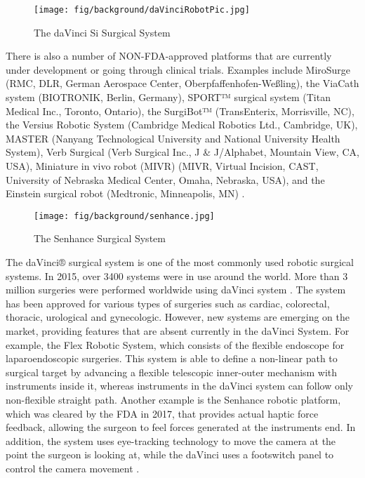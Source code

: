 \begin{figure}[h]
	\begin{center}
	\texttt{[image: fig/background/daVinciRobotPic.jpg]}
	\end{center}
	\vspace{-4mm}
	\caption[The daVinci Si Surgical System]
	{The daVinci Si Surgical System \cite{_intuitive_2018}}
	\label{fig:daVinci}
	\vspace{-2mm}
\end{figure}

There is also a number of NON-FDA-approved platforms that are currently under development or going through clinical trials. Examples include MiroSurge (RMC, DLR, German Aerospace Center, Oberpfaffenhofen-Weßling), the ViaCath system (BIOTRONIK, Berlin, Germany), SPORT™ surgical system (Titan Medical Inc., Toronto, Ontario), the SurgiBot™ (TransEnterix, Morrisville, NC), the Versius Robotic System (Cambridge Medical Robotics Ltd., Cambridge, UK), MASTER (Nanyang Technological University and National University Health System), Verb Surgical (Verb Surgical Inc., J \& J/Alphabet, Mountain View, CA, USA), Miniature in vivo robot (MIVR) (MIVR, Virtual Incision, CAST, University of Nebraska Medical Center, Omaha, Nebraska, USA), and the Einstein surgical robot (Medtronic, Minneapolis, MN) \cite{peters_review_2018}.

\begin{figure}[h]
	\begin{center}
	\texttt{[image: fig/background/senhance.jpg]}
	\end{center}
	\vspace{-4mm}
	\caption[The Senhance Surgical System]
	{The Senhance Surgical System \cite{_senhance}}
	\label{fig:Senhance}
	\vspace{-2mm}
\end{figure}

The daVinci® surgical system is one of the most commonly used robotic surgical systems. In 2015, over 3400 systems were in use around the world. More than 3 million surgeries were performed worldwide using daVinci system \cite{_intuitive_2018}. The system has been approved for various types of surgeries such as cardiac, colorectal, thoracic, urological and gynecologic. However, new systems are emerging on the market, providing features that are absent currently in the daVinci System. For example, the Flex Robotic System, which consists of the flexible endoscope for laparoendoscopic surgeries. This system is able to define a non-linear path to surgical target by advancing a flexible telescopic inner-outer mechanism with instruments inside it, whereas instruments in the daVinci system can follow only non-flexible straight path. Another example is the Senhance robotic platform, which was cleared by the FDA in 2017, that provides actual haptic force feedback, allowing the surgeon to feel forces generated at the instruments end. In addition, the system uses eye-tracking technology to move the camera at the point the surgeon is looking at, while the daVinci uses a footswitch panel to control the camera movement \cite{peters_review_2018}.

